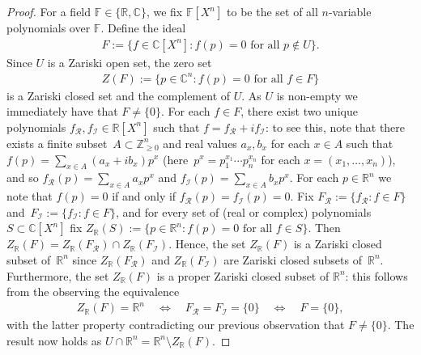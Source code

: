 \documentclass[11pt]{article}
\theoremstyle{definition}
\numberwithin{equation}{section}
\begin{document}
\begin{proof}
	For a field $\mathbb{F} \in \{ \mathbb{R}, \mathbb{C}\}$,
	we fix $\mathbb{F}[X^n]$ to be the set of all $n$-variable polynomials over $\mathbb{F}$.
	Define the ideal 
	\begin{align*}
		F := \{ f \in \mathbb{C}[X^n] : f(p) = 0 \text{ for all } p \notin U\}.
	\end{align*}
	Since $U$ is a Zariski open set,
	the zero set
	\begin{align*}
		Z(F) := \{p \in \mathbb{C}^n: f(p) = 0 \text{ for all } f \in F\}
	\end{align*}
	is a Zariski closed set and the complement of $U$.
	As $U$ is non-empty we immediately have that $F \neq \{0\}$.
	For each $f \in F$,
	there exist two unique polynomials \mbox{$f_{\mathcal{R}},f_{\mathcal{I}} \in \mathbb{R}[X^n]$} such that $f = f_{\mathcal{R}}+ i f_{\mathcal{I}}$:
	to see this, note that there exists a finite subset~$A \subset \mathbb{Z}^n_{\geq 0}$ and real values $a_x,b_x $ for each $x \in A$ such that $f(p) = \sum_{x \in A} (a_x + i b_x) p^x$ (here~$p^x = p_1^{x_1} \cdots p_n^{x_n}$ for each $x=(x_1,\ldots,x_n)$),
	and so $f_{\mathcal{R}}(p) = \sum_{x \in A} a_x p^x$ and $f_{\mathcal{I}}(p) = \sum_{x \in A} b_x p^x$.
	For each $p \in \mathbb{R}^n$ we note that $f(p) = 0$ if and only if $f_{\mathcal{R}}(p) = f_{\mathcal{I}}(p) = 0$.
	Fix $F_\mathcal{R} := \{ f_{\mathcal{R}} :f \in F\}$ and~$F_\mathcal{I} := \{ f_{\mathcal{I}} :f \in F\}$,
	and for every set of (real or complex) polynomials $S \subset \mathbb{C}[X^n]$ fix $Z_{\mathbb{R}}(S):= \{p \in \mathbb{R}^n : f(p) = 0 \text{ for all } f \in S \}$.
	Then $Z_{\mathbb{R}}(F) = Z_{\mathbb{R}}(F_{\mathcal{R}}) \cap Z_{\mathbb{R}}(F_{\mathcal{I}})$.
	Hence, the set $Z_{\mathbb{R}}(F)$ is a Zariski closed subset of~$\mathbb{R}^n$ since $Z_{\mathbb{R}}(F_{\mathcal{R}})$ and $Z_{\mathbb{R}}(F_{\mathcal{I}})$ are Zariski closed subsets of~$\mathbb{R}^n$.
	Furthermore,
	the set $Z_{\mathbb{R}}(F)$ is a proper Zariski closed subset of $\mathbb{R}^n$:
	this follows from the observing the equivalence
	\begin{align*}
		Z_{\mathbb{R}}(F) = \mathbb{R}^n \quad \Leftrightarrow \quad F_{\mathcal{R}} = F_{\mathcal{I}} = \{0\}  \quad \Leftrightarrow \quad F= \{0\},
	\end{align*}
	with the latter property contradicting our previous observation that $F \neq \{0\}$.
	The result now holds as $U \cap \mathbb{R}^n = \mathbb{R}^n \setminus Z_{\mathbb{R}}(F)$.
\end{proof}
\end{document}
